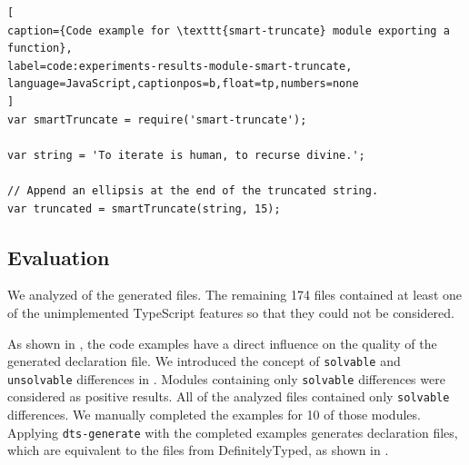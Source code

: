 \documentclass[sigconf]{acmart}
\begin{document}
\begin{lstlisting}[
caption={Code example for \texttt{smart-truncate} module exporting a function},
label=code:experiments-results-module-smart-truncate,
language=JavaScript,captionpos=b,float=tp,numbers=none
]
var smartTruncate = require('smart-truncate');

var string = 'To iterate is human, to recurse divine.';

// Append an ellipsis at the end of the truncated string.
var truncated = smartTruncate(string, 15);
\end{lstlisting}

\subsection{Evaluation}
\label{sec:experiments-evaluation}
We analyzed \CountModulesOnlySolvableDifferences{} of the \CountModulesGeneratedDeclarationFile{} generated files. The remaining 174 files contained at least one
of the unimplemented TypeScript features so that they could not be
considered.


As shown in , the code examples have a
direct influence on the quality of the generated declaration file. We introduced the
concept of \texttt{solvable} and \texttt{unsolvable} differences in
. Modules containing only \texttt{solvable} differences were
considered as positive results. All of the analyzed files contained only \texttt{solvable} differences. We manually completed the
examples for 10 of those modules. Applying \texttt{dts-generate} with the completed
examples generates declaration files, which are equivalent to the files from DefinitelyTyped, as
shown in .
\end{document}
